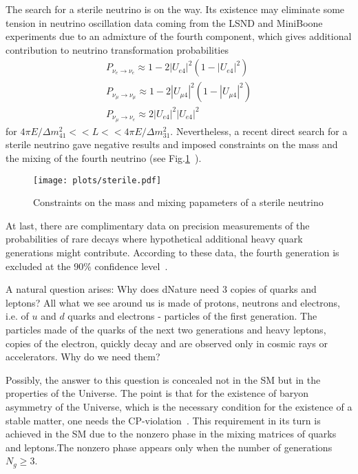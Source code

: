 \documentclass{cernyrep}
\begin{document}
The search for  a sterile neutrino is on the way. Its existence may eliminate some tension in neutrino oscillation data coming from the LSND and MiniBoone experiments due to an admixture of the fourth component, which gives additional contribution to neutrino transformation probabilities
$$\begin{array}{l}
P_{\nu_e\to\nu_e}\approx 1-2|U_{e4}|^2(1-|U_{e4}|^2)\\
P_{\nu_\mu\to\nu_\mu}\approx 1-2|U_{\mu4}|^2(1-|U_{\mu4}|^2)\\
P_{\nu_\mu\to\nu_e}\approx 2|U_{e4}|^2 |U_{e4}|^2
\end{array}$$
for $4\pi E/\Delta m^2_{41}<<L<<4\pi E/\Delta m^2_{31}$.
Nevertheless, a recent direct search for a sterile neutrino gave negative results and imposed constraints on the mass and the mixing of the fourth neutrino (see Fig.\ref{sterile}~\cite{sterile}).
\begin{figure}[ht]
\begin{center}
\leavevmode
\texttt{[image: plots/sterile.pdf]}
\end{center}\caption{Constraints on the mass and mixing papameters of  a sterile neutrino}
\label{sterile}
\end{figure}

At last, there are complimentary data on precision measurements of the probabilities of rare decays where hypothetical additional heavy quark generations might contribute. According to these data, the fourth generation is excluded at the 90\% confidence level~\cite{4gen}.

A natural question arises:  Why does dNature need 3 copies of quarks and leptons?  All what we see around us is made of protons, neutrons and electrons, i.e. of  $u$ and  $d$ quarks and electrons - particles of the first generation. The particles made of the quarks of the next two generations and heavy leptons, copies of the electron, quickly decay and are observed only in cosmic rays or accelerators. Why do we need them? 

Possibly, the answer to this question is concealed not in the SM but in the properties of the Universe.  The point is that for the existence of baryon asymmetry of the Universe, which is the necessary condition for the existence of a stable matter, one needs the CP-violation~\cite{Sakharov}. This requirement in its turn is achieved in the SM due to the nonzero phase  in the mixing matrices of quarks and leptons.The nonzero phase appears only when the number of generations  $N_g \geq 3$.
\end{document}
